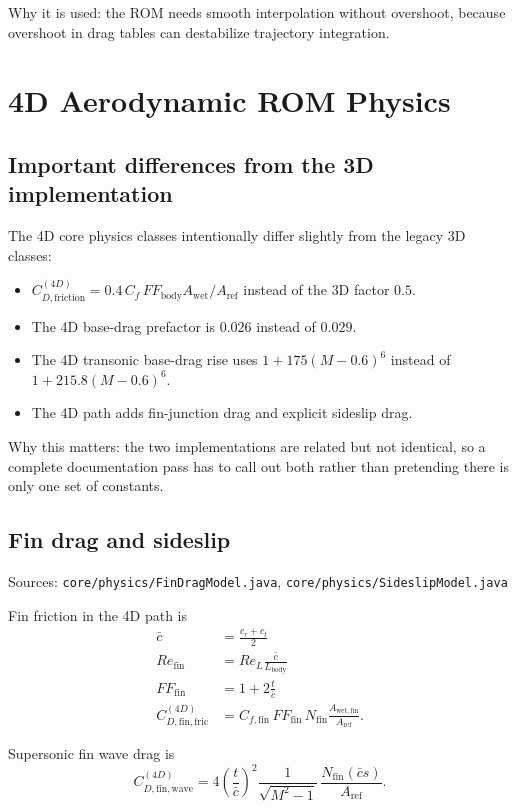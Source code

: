 \documentclass[11pt]{article}
\begin{document}
Why it is used: the ROM needs smooth interpolation without overshoot, because overshoot in drag tables can destabilize trajectory integration.

\section{4D Aerodynamic ROM Physics}
\subsection{Important differences from the 3D implementation}
The 4D core physics classes intentionally differ slightly from the legacy 3D classes:
\begin{itemize}
\item $C_{D,\mathrm{friction}}^{(4D)} = 0.4\,C_f\,FF_{\mathrm{body}}A_{\mathrm{wet}}/A_{\mathrm{ref}}$ instead of the 3D factor $0.5$.
\item The 4D base-drag prefactor is $0.026$ instead of $0.029$.
\item The 4D transonic base-drag rise uses $1 + 175(M-0.6)^6$ instead of $1 + 215.8(M-0.6)^6$.
\item The 4D path adds fin-junction drag and explicit sideslip drag.
\end{itemize}

Why this matters: the two implementations are related but not identical, so a complete documentation pass has to call out both rather than pretending there is only one set of constants.

\subsection{Fin drag and sideslip}
Sources: \texttt{core/physics/FinDragModel.java}, \texttt{core/physics/SideslipModel.java}

Fin friction in the 4D path is
\begin{align*}
\bar c &= \frac{c_r+c_t}{2} \\
Re_{\mathrm{fin}} &= Re_L\frac{\bar c}{L_{\mathrm{body}}} \\
FF_{\mathrm{fin}} &= 1 + 2\frac{t}{\bar c} \\
C_{D,\mathrm{fin,fric}}^{(4D)} &= C_{f,\mathrm{fin}}\,FF_{\mathrm{fin}}\,N_{\mathrm{fin}}\frac{A_{\mathrm{wet,fin}}}{A_{\mathrm{ref}}}.
\end{align*}

Supersonic fin wave drag is
\begin{equation*}
C_{D,\mathrm{fin,wave}}^{(4D)} = 4\left(\frac{t}{\bar c}\right)^2\frac{1}{\sqrt{M^2-1}}\,\frac{N_{\mathrm{fin}}(\bar c s)}{A_{\mathrm{ref}}}.
\end{equation*}
\end{document}
